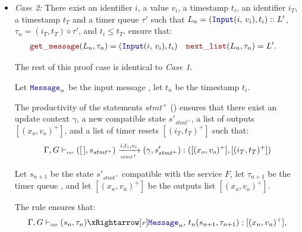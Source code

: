 \begin{skippableproof}
\begin{itemize}
\begin{itemize}
                        Let $L_{n+1}$ be the remaining list $L'$.

                  \item \textit{Case 2:} There exist an identifier $i$, a value $v_i$, a timestamp
                        $t_i$, an identifier $i_T$, a timestamp $t_T$ and a timer queue $\tau'$ such
                        that $L_n = (\inputMess{i}{v_i}, t_i) :: L'$, $\tau_n = (i_T, t_T) \diamond
                            \tau'$, and $t_i \le t_T$.
                        ensure that:
                        \begin{align*}
                            \getMess{L_n}{\tau_n}  & = (\inputMess{i}{v_i}, t_i) &
                            \nextList{L_n}{\tau_n} & = L'.
                        \end{align*}

                        The rest of this proof case is identical to \textit{Case 1}.

                        Let $\mess_n$ be the input message , let $t_n$ be the
                        timestamp $t_i$.

                        The productivity of the statements $stmt^+$ () ensures that there exist an update context
                        $\gamma$, a new compatible state $s'_{stmt^+}$, a list of outputs $[(x_o,
                                    v_o)^+]$, and a list of timer resets $[(i_T, t_T)^+]$ such that:
                        \begin{equation*}
                            \Gamma, G \vdash_{\textnormal{\tiny\textsc{frp}}} ([\,], s_{stmt^+}) \xrightarrow[\mbox{\tiny\ensuremath{stmt^+}}]{i, t_i, v_i} (\gamma, s'_{stmt^+}): ([(x_o, v_o)^+], [(i_T, t_T)^+])
                        \end{equation*}

                        Let $s_{n+1}$ be the state $s'_{stmt^+}$ compatible with the service $F$,
                        let $\tau_{n+1}$ be the timer queue , and let
                        $[(x_n, v_n)^+]$ be the outputs list $[(x_o, v_o)^+]$.

                        The rule  ensures
                        that:
                        \begin{equation*}
                            \serviceOpSem{s_n}{\tau_n}{F}{\mess_n}{t_n}{s_{n+1}}{\tau_{n+1}}{(x_n, v_n)^+},
                        \end{equation*}


\end{itemize}
\end{itemize}
\end{skippableproof}
